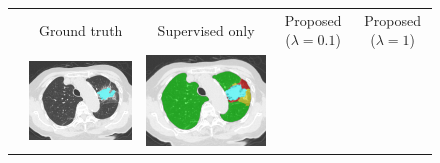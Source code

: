 \newcommand{\vertical}[1]{\rotatebox[origin=c]{90}{#1}}
\begin{figure}[htbp]
  \begin{tabular}{ccccc}
    & Ground truth & Supervised only &  Proposed ($\lambda=0.1$) & Proposed ($\lambda=1$) \\

    \vertical{CON \textcolor{cyan}{$\blacksquare$}} &
    \begin{minipage}[c]{.21\textwidth}
      \centering
      \includegraphics[width=1\textwidth]{images/median/truth/1_0764_20080619_2_495.png}
    \end{minipage} &
    \begin{minipage}[c]{.21\textwidth}
      \centering
      \includegraphics[width=1\textwidth]{images/median/alpha0/1_0764_20080619_2_495.png}

\end{minipage}
\end{tabular}
\end{figure}
